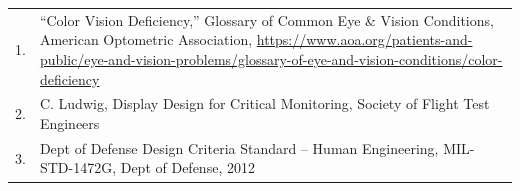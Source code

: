 \documentclass[
]{book}
\begin{document}
\begin{longtable}[]{@{}ll@{}}
\toprule
\endhead
\begin{minipage}[t]{0.01\columnwidth}\raggedright
1.\strut
\end{minipage} & \begin{minipage}[t]{0.93\columnwidth}\raggedright
``Color Vision Deficiency,'' Glossary of Common Eye \& Vision Conditions, American Optometric Association, \url{https://www.aoa.org/patients-and-public/eye-and-vision-problems/glossary-of-eye-and-vision-conditions/color-deficiency}\strut
\end{minipage}\tabularnewline
\begin{minipage}[t]{0.01\columnwidth}\raggedright
2.\strut
\end{minipage} & \begin{minipage}[t]{0.93\columnwidth}\raggedright
C. Ludwig, Display Design for Critical Monitoring, Society of Flight Test Engineers\strut
\end{minipage}\tabularnewline
\begin{minipage}[t]{0.01\columnwidth}\raggedright
3.\strut
\end{minipage} & \begin{minipage}[t]{0.93\columnwidth}\raggedright
Dept of Defense Design Criteria Standard -- Human Engineering, MIL-STD-1472G, Dept of Defense, 2012\strut
\end{minipage}\tabularnewline
\bottomrule
\end{longtable}
\end{document}
